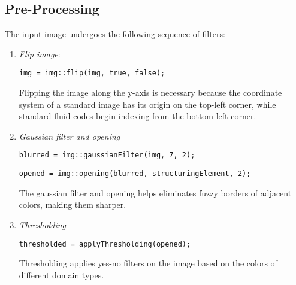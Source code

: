 \subsection{Pre-Processing}

The input image undergoes the following sequence of filters:

\begin{enumerate}
	\item \textit{Flip image}: 
	
	\verb|img = img::flip(img, true, false);|
	
	Flipping the image along the y-axis is necessary because the coordinate system of a standard image has its origin on the top-left corner, while standard fluid codes begin indexing from the bottom-left corner.

	\item \textit{Gaussian filter and opening}

	\verb|blurred = img::gaussianFilter(img, 7, 2);|

	\verb|opened = img::opening(blurred, structuringElement, 2);|
	
	The gaussian filter and opening helps eliminates fuzzy borders of adjacent colors, making them sharper.

	\item \textit{Thresholding}

	\verb|thresholded = applyThresholding(opened);|
	
	Thresholding applies yes-no filters on the image based on the colors of different domain types.

\end{enumerate}
